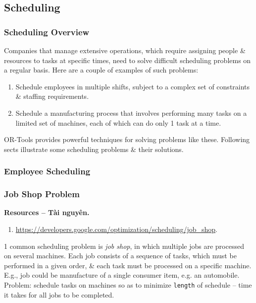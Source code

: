 \documentclass{article}
\begin{document}

\subsection{Scheduling}


\subsubsection{Scheduling Overview}
Companies that manage extensive operations, which require assigning people \& resources to tasks at specific times, need to solve difficult scheduling problems on a regular basis. Here are a couple of examples of such problems:
\begin{enumerate}
    \item Schedule employees in multiple shifts, subject to a complex set of constraints \& staffing requirements.
    \item Schedule a manufacturing process that involves performing many tasks on a limited set of machines, each of which can do only 1 task at a time.
\end{enumerate}
OR-Tools provides powerful techniques for solving problems like these. Following sects illustrate some scheduling problems \& their solutions.


\subsubsection{Employee Scheduling}


\subsubsection{Job Shop Problem}
\textbf{\textsf{Resources -- Tài nguyên.}}
\begin{enumerate}
    \item \url{https://developers.google.com/optimization/scheduling/job_shop}.
\end{enumerate}
1 common scheduling problem is {\it job shop}, in which multiple jobs are processed on several machines. Each job consists of a sequence of tasks, which must be performed in a given order, \& each task must be processed on a specific machine. E.g., job could be manufacture of a single consumer item, e.g. an automobile. Problem: schedule tasks on machines so as to minimize {\tt length} of schedule -- time it takes for all jobs to be completed.
\end{document}
